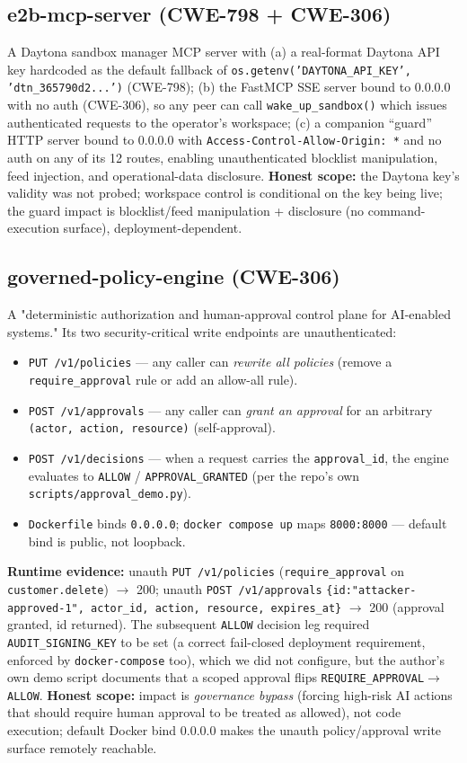 \documentclass{llncs}
\begin{document}
\subsection{e2b-mcp-server (CWE-798 + CWE-306)}\label{sub:e2b}
A Daytona sandbox manager MCP server with (a) a real-format Daytona API key hardcoded as the default fallback of \texttt{os.getenv('DAYTONA\_API\_KEY', 'dtn\_365790d2...')} (CWE-798); (b) the FastMCP SSE server bound to 0.0.0.0 with no auth (CWE-306), so any peer can call \texttt{wake\_up\_sandbox()} which issues authenticated requests to the operator's workspace; (c) a companion ``guard'' HTTP server bound to 0.0.0.0 with \texttt{Access-Control-Allow-Origin: *} and no auth on any of its 12 routes, enabling unauthenticated blocklist manipulation, feed injection, and operational-data disclosure. \textbf{Honest scope:} the Daytona key's validity was not probed; workspace control is conditional on the key being live; the guard impact is blocklist/feed manipulation + disclosure (no command-execution surface), deployment-dependent.

\subsection{governed-policy-engine (CWE-306)}\label{sub:governed}
A "deterministic authorization and human-approval control plane for AI-enabled systems." Its two security-critical write endpoints are unauthenticated:
\begin{itemize}
    \item \texttt{PUT /v1/policies} — any caller can \emph{rewrite all policies} (remove a \texttt{require\_approval} rule or add an allow-all rule).
    \item \texttt{POST /v1/approvals} — any caller can \emph{grant an approval} for an arbitrary \texttt{(actor, action, resource)} (self-approval).
    \item \texttt{POST /v1/decisions} — when a request carries the \texttt{approval\_id}, the engine evaluates to \texttt{ALLOW} / \texttt{APPROVAL\_GRANTED} (per the repo's own \texttt{scripts/approval\_demo.py}).
    \item \texttt{Dockerfile} binds \texttt{0.0.0.0}; \texttt{docker compose up} maps \texttt{8000:8000} — default bind is public, not loopback.
\end{itemize}
\textbf{Runtime evidence:} unauth \texttt{PUT /v1/policies} (\texttt{require\_approval} on \texttt{customer.delete}) $\to$ 200; unauth \texttt{POST /v1/approvals} \texttt{\{id:"attacker-approved-1", actor\_id, action, resource, expires\_at\}} $\to$ 200 (approval granted, id returned). The subsequent \texttt{ALLOW} decision leg required \texttt{AUDIT\_SIGNING\_KEY} to be set (a correct fail-closed deployment requirement, enforced by \texttt{docker-compose} too), which we did not configure, but the author's own demo script documents that a scoped approval flips \texttt{REQUIRE\_APPROVAL}$\to$\texttt{ALLOW}. \textbf{Honest scope:} impact is \emph{governance bypass} (forcing high-risk AI actions that should require human approval to be treated as allowed), not code execution; default Docker bind 0.0.0.0 makes the unauth policy/approval write surface remotely reachable.
\end{document}

